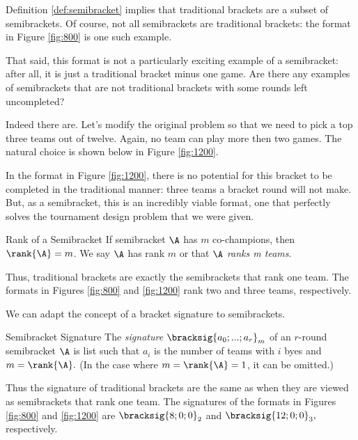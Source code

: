 {    Definition \ref{def:semibracket} implies that traditional brackets are a subset of semibrackets. Of course, not all semibrackets are traditional brackets: the format in Figure \ref{fig:800} is one such example.

    That said, this format is not a particularly exciting example of a semibracket: after all, it is just a traditional bracket minus one game. Are there any examples of semibrackets that are not traditional brackets with some rounds left uncompleted?

    Indeed there are. Let's modify the original problem so that we need to pick a top three teams out of twelve. Again, no team can play more then two games. The natural choice is shown below in Figure \ref{fig:1200}.
    

    In the format in Figure \ref{fig:1200}, there is no potential for this bracket to be completed in the traditional manner: three teams a bracket round will not make. But, as a semibracket, this is an incredibly viable format, one that perfectly solves the tournament design problem that we were given.
    
    \begin{definition}{Rank of a Semibracket}{}
        If semibracket $\A$ has $m$ co-champions, then $\rank{\A} = m$. We say $\A$ has rank $m$ or that $\A$ \textit{ranks m teams}.
    \end{definition}

    Thus, traditional brackets are exactly the semibrackets that rank one team. The formats in Figures \ref{fig:800} and \ref{fig:1200} rank two and three teams, respectively.

    We can adapt the concept of a bracket signature to semibrackets.

    \begin{definition}{Semibracket Signature}{}
        The \textit{signature} $\bracksig{a_0; ...; a_r}_m$ of an $r$-round semibracket $\A$ is list such that $a_i$ is the number of teams with $i$ byes and $m = \rank{\A}.$ (In the case where $m = \rank{\A} = 1$, it can be omitted.)
    \end{definition}

    Thus the signature of traditional brackets are the same as when they are viewed as semibrackets that rank one team. The signatures of the formats in Figures \ref{fig:800} and \ref{fig:1200} are $\bracksig{8;0;0}_2$ and $\bracksig{12;0;0}_3,$ respectively.

}
